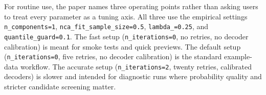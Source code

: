 For routine use, the paper names three operating points rather than asking
users to treat every parameter as a tuning axis. All three use the empirical
settings \texttt{n\_components=1},
\texttt{nca\_fit\_sample\_size=0.5}, \texttt{lambda\_=0.25}, and
\texttt{quantile\_guard=0.1}. The fast
setup (\texttt{n\_iterations=0}, no retries, no decoder calibration) is meant
for smoke tests and quick previews. The default setup
(\texttt{n\_iterations=0}, five retries, no decoder calibration) is the
standard example-data workflow. The accurate setup
(\texttt{n\_iterations=2}, twenty retries, calibrated decoders) is slower and
intended for diagnostic runs where probability quality and stricter candidate
screening matter.
